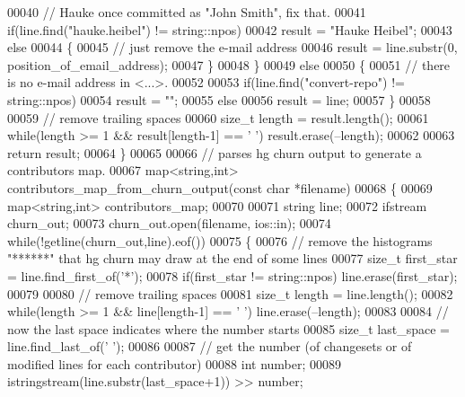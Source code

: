 \begin{DoxyCode}
00040     \textcolor{comment}{// Hauke once committed as "John Smith", fix that.}
00041     \textcolor{keywordflow}{if}(line.find(\textcolor{stringliteral}{"hauke.heibel"}) != string::npos)
00042       result = \textcolor{stringliteral}{"Hauke Heibel"};
00043     \textcolor{keywordflow}{else}
00044     \{
00045       \textcolor{comment}{// just remove the e-mail address}
00046       result = line.substr(0, position\_of\_email\_address);
00047     \}
00048   \}
00049   \textcolor{keywordflow}{else}
00050   \{
00051     \textcolor{comment}{// there is no e-mail address in <...>.}
00052     
00053     \textcolor{keywordflow}{if}(line.find(\textcolor{stringliteral}{"convert-repo"}) != string::npos)
00054       result = \textcolor{stringliteral}{""};
00055     \textcolor{keywordflow}{else}
00056       result = line;
00057   \}
00058 
00059   \textcolor{comment}{// remove trailing spaces}
00060   \textcolor{keywordtype}{size\_t} length = result.length();
00061   \textcolor{keywordflow}{while}(length >= 1 && result[length-1] == \textcolor{charliteral}{' '}) result.erase(--length);
00062 
00063   \textcolor{keywordflow}{return} result;
00064 \}
00065 
00066 \textcolor{comment}{// parses hg churn output to generate a contributors map.}
00067 map<string,int> contributors\_map\_from\_churn\_output(\textcolor{keyword}{const} \textcolor{keywordtype}{char} *filename)
00068 \{
00069   map<string,int> contributors\_map;
00070 
00071   \textcolor{keywordtype}{string} line;
00072   ifstream churn\_out;
00073   churn\_out.open(filename, ios::in);
00074   \textcolor{keywordflow}{while}(!getline(churn\_out,line).eof())
00075   \{
00076     \textcolor{comment}{// remove the histograms "******" that hg churn may draw at the end of some lines}
00077     \textcolor{keywordtype}{size\_t} first\_star = line.find\_first\_of(\textcolor{charliteral}{'*'});
00078     \textcolor{keywordflow}{if}(first\_star != string::npos) line.erase(first\_star);
00079     
00080     \textcolor{comment}{// remove trailing spaces}
00081     \textcolor{keywordtype}{size\_t} length = line.length();
00082     \textcolor{keywordflow}{while}(length >= 1 && line[length-1] == \textcolor{charliteral}{' '}) line.erase(--length);
00083 
00084     \textcolor{comment}{// now the last space indicates where the number starts}
00085     \textcolor{keywordtype}{size\_t} last\_space = line.find\_last\_of(\textcolor{charliteral}{' '});
00086     
00087     \textcolor{comment}{// get the number (of changesets or of modified lines for each contributor)}
00088     \textcolor{keywordtype}{int} number;
00089     istringstream(line.substr(last\_space+1)) >> number;

\end{DoxyCode}
